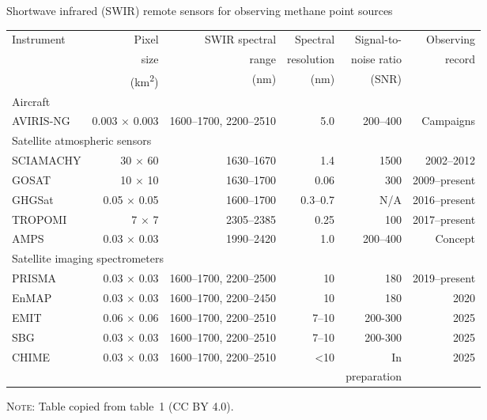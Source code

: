 \begin{threeparttable}
 \caption{Shortwave infrared (SWIR) remote sensors for observing methane point sources}
 \label{tab:new-satellite-platforms}
\begin{tabular}{l r r r r r}
\toprule
Instrument & 
Pixel  & 
SWIR spectral & 
Spectral  & 
Signal-to- & 
Observing  \\
 & 
size &
range  & 
resolution &
noise ratio &
record %
\\
&
(km\textsuperscript{2}) &
(nm) &
(nm) &
(SNR) &
\\
\midrule
\multicolumn{6}{l}{Aircraft}\\
\midrule
AVIRIS-NG & 0.003 $\times$ 0.003 & 
1600--1700, 2200--2510 & 
5.0 & 200--400 & Campaigns\\
\midrule
\multicolumn{6}{l}{Satellite atmospheric sensors}\\
\midrule
SCIAMACHY & 30 $\times$ 60 & 1630--1670 & 1.4 & 1500 & 2002--2012\\
GOSAT & 10 $\times$ 10 & 1630--1700 & 0.06 & 300 & 2009--present\\
GHGSat & 0.05 $\times$ 0.05 & 1600--1700 & 0.3--0.7 & N/A & 2016--present \\
TROPOMI & 7 $\times$ 7 & 2305--2385 & 0.25 & 100 & 2017--present \\
AMPS & 0.03 $\times$ 0.03 & 1990--2420 & 1.0 & 200--400 & Concept\\
\midrule
\multicolumn{6}{l}{Satellite imaging spectrometers}\\
\midrule
PRISMA & 0.03 $\times$ 0.03 & 1600--1700, 2200--2500 & 10 & 180 & 2019--present \\
EnMAP & 0.03 $\times$ 0.03 & 1600--1700, 2200--2450 & 10 & 180 & 2020 \\
EMIT & 0.06 $\times$ 0.06 & 1600--1700, 2200--2510 & 7--10 & 200-300 & 2025 \\
SBG & 0.03 $\times$ 0.03 & 1600--1700, 2200--2510 & 7--10 & 200-300 & 2025 \\
CHIME & 0.03 $\times$ 0.03 & 1600--1700, 2200--2510 & <10 & In & 2025 \\
 &  &  &  &  preparation &  \\



\bottomrule
\end{tabular}
\begin{tablenotes}
\item \textsc{Note:} Table copied from \textcite{Cusworth/Jacob/Varon/Miller/Liu/Chance/Thorpe/Duren/Miller/Thompson/Frankenberg/Guanter/Randles:2019} table~1 (CC BY 4.0).



\end{tablenotes}
\end{threeparttable}
